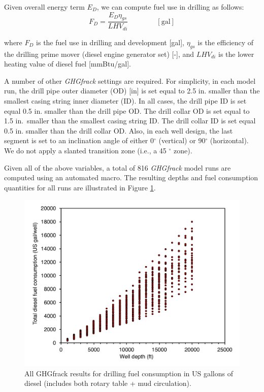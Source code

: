 \documentclass[11pt]{report}
\newcommand{\eqnunit}[1]{\quad\quad \scriptstyle{\left[\text{#1}\right]}}
\begin{document}
Given overall energy term $E_{D}$, we can compute fuel use in drilling as follows:
\begin{equation}
F_{D} = \frac{E_{D} \eta_{gs}}{LHV_{di}} \quad\quad\eqnunit{gal}
\end{equation}

where $F_{D}$ is the fuel use in drilling and development [gal], $\eta_{gs}$ is the efficiency of the drilling prime mover (diesel engine generator set) [-], and $LHV_{di}$ is the lower heating value of diesel fuel [mmBtu/gal].

A number of other \emph{GHGfrack} settings are required. For simplicity, in each model run, the drill pipe outer diameter (OD) [in] is set equal to 2.5 in. smaller than the smallest casing string inner diameter (ID).  In all cases, the drill pipe ID is set equal 0.5 in. smaller than the drill pipe OD.  The drill collar OD is set equal to 1.5 in.\, smaller than the smallest casing string ID.  The drill collar ID is set equal 0.5 in. smaller than the drill collar OD.  Also, in each well design, the last segment is set to an inclination angle of either 0$^\circ$ (vertical) or 90$^\circ$ (horizontal).  We do not apply a slanted transition zone (i.e., a 45 $^\circ$ zone).   

Given all of the above variables, a total of 816 \emph{GHGfrack} model runs are computed using an automated macro.  The resulting depths and fuel consumption quantities for all runs are illustrated in Figure \ref{fig:drilling1}.  

\begin{figure}[tb]
\includegraphics[width=0.8\columnwidth]{images/Drilling1.pdf}
\caption{All GHGfrack results for drilling fuel consumption in US gallons of diesel (includes both rotary table + mud circulation).}
\label{fig:drilling1}
\end{figure}
\end{document}
